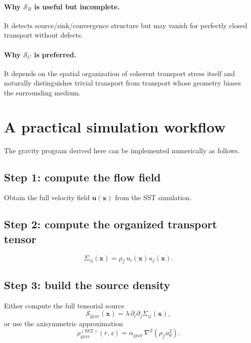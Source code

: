\documentclass[11pt]{article}
\newcommand{\rhoF}{\rho_{\!f}}
\newcommand{\SST}{\mathrm{SST}}
\newcommand{\grav}{\mathrm{grav}}
\begin{document}
        \paragraph{Why \(\mathcal{S}_B\) is useful but incomplete.}
            It detects source/sink/convergence structure but may vanish for perfectly closed transport without defects.
        
        \paragraph{Why \(\mathcal{S}_C\) is preferred.}
            It depends on the spatial organization of coherent transport stress itself and naturally distinguishes trivial transport from transport whose geometry biases the surrounding medium.
        
        \section{A practical simulation workflow}
        
        The gravity program derived here can be implemented numerically as follows.
        
        \subsection*{Step 1: compute the flow field}
            Obtain the full velocity field \(\mathbf{u}(\mathbf{x})\) from the SST simulation.
        
        \subsection*{Step 2: compute the organized transport tensor}
            \begin{equation}
                \Sigma_{ij}(\mathbf{x}) = \rhoF\,u_i(\mathbf{x})u_j(\mathbf{x}).
                \label{eq:workflow-Sigma}
            \end{equation}
        
        \subsection*{Step 3: build the source density}
            Either compute the full tensorial source
            \begin{equation}
                \mathcal{S}_{\grav}(\mathbf{x})
                =
                \lambda\,\partial_i\partial_j \Sigma_{ij}(\mathbf{x}),
                \label{eq:workflow-S}
            \end{equation}
            or use the axisymmetric approximation
            \begin{equation}
                \rho_{\grav}^{(\SST)}(r,z)=\alpha_{\grav}\,\nabla^2(\rhoF u_\theta^2).
                \label{eq:workflow-rhog}
            \end{equation}
        
\end{document}
